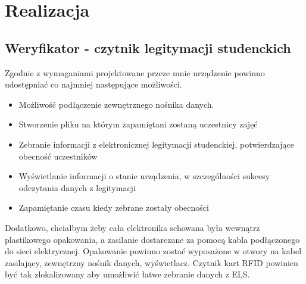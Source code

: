 \documentclass[declaration,shortabstract, mgr]{iithesis}
\begin{document}
\chapter{Realizacja}
\section{Weryfikator - czytnik legitymacji studenckich}
\indent Zgodnie z wymaganiami projektowane przeze mnie urządzenie powinno udostępniać co najmniej następujące możliwości.
\begin{itemize}
\item Możliwość podłączenie zewnętrznego nośnika danych.
\item Stworzenie pliku na którym zapamiętani zostaną uczestnicy zajęć
\item Zebranie informacji z elektronicznej legitymacji studenckiej, potwierdzające obecność uczestników
\item Wyświetlanie informacji o stanie urządzenia, w szczególności sukcesy odczytania danych z legitymacji
\item Zapamiętanie czasu kiedy zebrane zostały obecności
\end{itemize}
\indent Dodatkowo, chciałbym żeby cała elektronika schowana była wewnątrz plastikowego opakowania, a zasilanie dostarczane za pomocą kabla podłączonego do sieci elektrycznej. Opakowanie powinno zostać wyposażone w otwory na kabel zasilający, zewnętrzny nośnik danych, wyświetlacz. Czytnik kart RFID powinien być tak zlokalizowany aby umożliwić łatwe zebranie danych z ELS.
\end{document}
